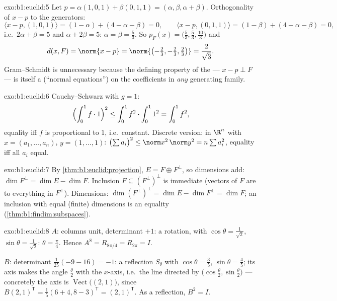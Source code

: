 \begin{solution}{exo:b1:euclid:5}
Let $p = \alpha(1,0,1) + \beta(0,1,1) = (\alpha, \beta, \alpha +
\beta)$. Orthogonality of $x - p$ to the generators:
\[
\langle x - p, (1,0,1)\rangle = (1 - \alpha) + (4 - \alpha - \beta)
= 0,
\qquad
\langle x - p, (0,1,1)\rangle = (1 - \beta) + (4 - \alpha - \beta)
= 0,
\]
i.e.\ $2\alpha + \beta = 5$ and $\alpha + 2\beta = 5$: $\alpha =
\beta = \frac53$. So $p_F(x) = \bigl(\frac53, \frac53,
\frac{10}{3}\bigr)$ and
\[
d(x, F) = \norm{x - p} =
\norm{\bigl(-\tfrac23, -\tfrac23, \tfrac23\bigr)} =
\frac{2}{\sqrt 3} .
\]
Gram--Schmidt is unnecessary because the defining property of the
 --- $x - p \perp F$ --- is itself a 
(``normal equations'') on the coefficients in \emph{any} generating
family.
\end{solution}

\begin{solution}{exo:b1:euclid:6}
Cauchy--Schwarz with $g = 1$:
\[
\Bigl(\int_0^1 f \cdot 1\Bigr)^2 \leq \int_0^1 f^2 \cdot \int_0^1
1^2 = \int_0^1 f^2 ,
\]
equality iff $f$ is proportional to $1$, i.e.\ constant. Discrete
version: in $\R^n$ with $x = (a_1, \dots, a_n)$, $y = (1, \dots,
1)$:
$\bigl(\sum a_i\bigr)^2 \leq \norm x^2\, \norm y^2 = n \sum a_i^2$,
equality iff all $a_i$ equal.
\end{solution}

\begin{solution}{exo:b1:euclid:7}
By \cref{thm:b1:euclid:projection}, $E = F \oplus F^\perp$, so
dimensions add: $\dim F^\perp = \dim E - \dim F$. Inclusion $F
\subseteq (F^\perp)^\perp$ is immediate (vectors of $F$ are
 to everything in $F^\perp$). Dimensions:
$\dim(F^\perp)^\perp = \dim E - \dim F^\perp = \dim F$; an
inclusion with equal (finite) dimensions is an equality
(\cref{thm:b1:findim:subspaces}).
\end{solution}

\begin{solution}{exo:b1:euclid:8}
$A$: columns unit, determinant $+1$: a rotation, with $\cos\theta =
\frac{1}{\sqrt2}$, $\sin\theta = \frac{1}{\sqrt2}$: $\theta =
\frac\pi4$. Hence $A^8 = R_{8\pi/4} = R_{2\pi} = I$.

$B$: determinant $\frac{1}{25}(-9 - 16) = -1$: a reflection
$S_\theta$ with $\cos\theta = \frac35$, $\sin\theta = \frac45$; its
axis makes the angle $\frac\theta2$ with the $x$-axis, i.e.\ the
line directed by $\bigl(\cos\frac\theta2, \sin\frac\theta2\bigr)$
--- concretely the axis is
$\operatorname{Vect}\bigl((2, 1)\bigr)$, since $B(2,1)^{\mathsf T} =
\frac15(6+4, 8-3)^{\mathsf T} = (2,1)^{\mathsf T}$. As a reflection,
$B^2 = I$.
\end{solution}

